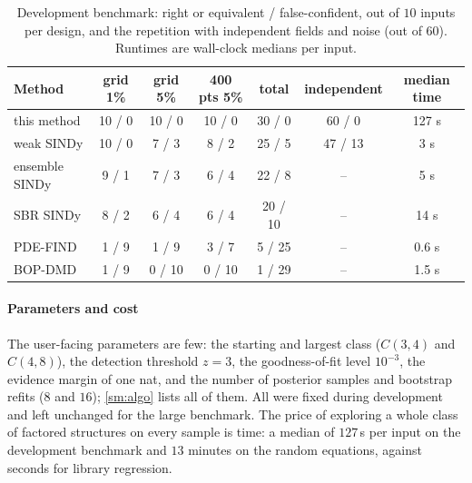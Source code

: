 \documentclass[11pt]{article}
\theoremstyle{plain}
\theoremstyle{definition}
\theoremstyle{remark}
\newcommand{\SMalgo}{\cref{sm:algo}}
\begin{document}
\begin{table}[tbp]
\centering\small
\caption{Development benchmark: right or equivalent / false-confident, out of $10$ inputs per design, and the
repetition with independent fields and noise (out of $60$). Runtimes are wall-clock medians per input.}\label{tab:bench}
\begin{tabular}{@{}lcccccc@{}}
\toprule
Method & grid 1\% & grid 5\% & 400 pts 5\% & total & independent & median time\\
\midrule
this method        & 10 / 0 & 10 / 0 & 10 / 0 & 30 / 0 & 60 / 0 & 127 s\\
weak SINDy         & 10 / 0 & \phantom{1}7 / 3 & \phantom{1}8 / 2 & 25 / 5 & 47 / 13 & 3 s\\
ensemble SINDy     & \phantom{1}9 / 1 & \phantom{1}7 / 3 & \phantom{1}6 / 4 & 22 / 8 & -- & 5 s\\
SBR SINDy          & \phantom{1}8 / 2 & \phantom{1}6 / 4 & \phantom{1}6 / 4 & 20 / 10 & -- & 14 s\\
PDE-FIND           & \phantom{1}1 / 9 & \phantom{1}1 / 9 & \phantom{1}3 / 7 & \phantom{1}5 / 25 & -- & 0.6 s\\
BOP-DMD            & \phantom{1}1 / 9 & \phantom{1}0 / 10 & \phantom{1}0 / 10 & \phantom{1}1 / 29 & -- & 1.5 s\\
\bottomrule
\end{tabular}
\end{table}

\paragraph{Parameters and cost} The user-facing parameters are few: the starting and largest class ($C(3,4)$ and
$C(4,8)$), the detection threshold $z=3$, the goodness-of-fit level $10^{-3}$, the evidence margin of one nat, and the
number of posterior samples and bootstrap refits ($8$ and $16$); \SMalgo{} lists all of them. All were fixed during
development and left unchanged for the large benchmark. The price of exploring a whole class of factored structures on
every sample is time: a median of $127$\,s per input on the development benchmark and $13$ minutes on the random
equations, against seconds for library regression.
\end{document}
